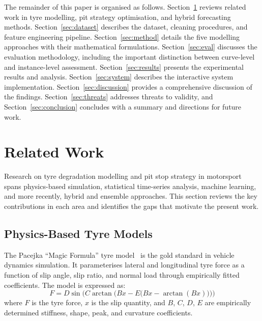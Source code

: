\documentclass[journal,twoside]{IEEEtran}
\begin{document}
The remainder of this paper is organised as follows.
Section~\ref{sec:related} reviews related work in tyre modelling, pit
strategy optimisation, and hybrid forecasting methods.
Section~\ref{sec:dataset} describes the dataset, cleaning procedures,
and feature engineering pipeline.  Section~\ref{sec:method} details
the five modelling approaches with their mathematical formulations.
Section~\ref{sec:eval} discusses the evaluation methodology, including
the important distinction between curve-level and instance-level
assessment.  Section~\ref{sec:results} presents the experimental
results and analysis.  Section~\ref{sec:system} describes the
interactive system implementation.  Section~\ref{sec:discussion}
provides a comprehensive discussion of the findings.
Section~\ref{sec:threats} addresses threats to validity, and
Section~\ref{sec:conclusion} concludes with a summary and directions
for future work.

\section{Related Work}\label{sec:related}

Research on tyre degradation modelling and pit stop strategy in
motorsport spans physics-based simulation, statistical time-series
analysis, machine learning, and more recently, hybrid and ensemble
approaches.  This section reviews the key contributions in each area
and identifies the gaps that motivate the present work.

\subsection{Physics-Based Tyre Models}

The Pacejka ``Magic Formula'' tyre model~\cite{pacejka2012tire} is the
gold standard in vehicle dynamics simulation.  It parameterises lateral
and longitudinal tyre force as a function of slip angle, slip ratio, and
normal load through empirically fitted coefficients.  The model is
expressed as:
\begin{equation}
  F = D \sin\!\bigl(C \arctan\bigl(B x - E\bigl(B x - \arctan(B x)
  \bigr)\bigr)\bigr)
  \label{eq:pacejka}
\end{equation}
where $F$ is the tyre force, $x$ is the slip quantity, and $B$, $C$,
$D$, $E$ are empirically determined stiffness, shape, peak, and
curvature coefficients.
\end{document}
